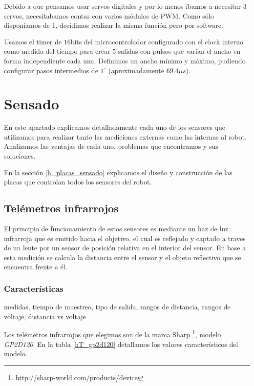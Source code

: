 Debido a que pensamos usar servos digitales y por lo menos \'ibamos a necesitar $3$ servos, necesitabamos contar con varios m\'odulos de PWM.
Como s\'olo dispon\'iamos de 1, decidimos realizar la misma funci\'on pero por software.

Usamos el timer de $16$bits del microcontrolador configurado con el clock interno como medida del tiempo para crear $5$ salidas con
pulsos que var\'ian el ancho en forma independiente cada una.
Definimos un ancho m\'inimo y m\'aximo, pudiendo configurar pasos intermedios de $1^{\circ}$ (aproximadamente $69.4\mu s$).

\section{Sensado}
\label{h_sensado}

En este apartado explicamos detalladamente cada uno de los sensores que utilizamos para realizar tanto las mediciones externas como las internas al robot.
Analizamos las ventajas de cada uno, problemas que encontramos y sus soluciones.

En la secci\'on \ref{h_placas_sensado} explicamos el dise\~no y construcci\'on de las placas que controlan todos los sensores del robot.

\subsection{Tel\'emetros infrarrojos}
\label{h_sensado_telemetros}

El principio de funcionamiento de estos sensores es mediante un haz de luz infrarroja que es emitido hacia el objetivo, el cual
es reflejado y captado a traves de un lente por un sensor de posici\'on relativa en el interior del sensor.
En base a esta medici\'on se calcula la distancia entre el sensor y el objeto reflectivo que se encuentra frente a \'el.

\subsubsection{Caracter\'isticas}
\label{h_sensado_telemetros_caracteristicas}

medidas, tiempo de muestreo, tipo de salida, rangos de distancia, rangos de voltaje, distancia vs voltaje

Los tel\'emetros infrarrojos que elegimos son de la marca Sharp \footnote{http://sharp-world.com/products/device}, modelo \emph{GP2D120}.
En la tabla \ref{hT_gp2d120} detallamos los valores caracter\'isticos del modelo.


